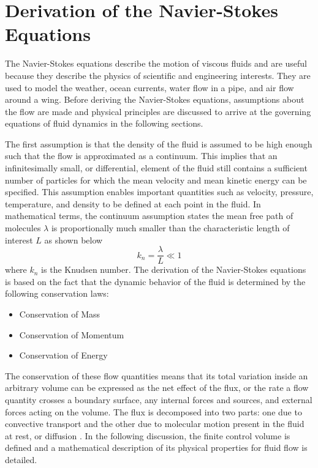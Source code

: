 \section{Derivation of the Navier-Stokes Equations}

The Navier-Stokes equations describe the motion of viscous fluids and are useful because they describe the physics of scientific and engineering interests. They are used to model the weather, ocean currents, water flow in a pipe, and air flow around a wing. Before deriving the Navier-Stokes equations, assumptions about the flow are made and physical principles are discussed to arrive at the governing equations of fluid dynamics in the following sections.

The first assumption is that the density of the fluid is assumed to be high enough such that the flow is approximated as a continuum. This implies that an infinitesimally small, or differential, element of the fluid still contains a sufficient number of particles for which the mean velocity and mean kinetic energy can be specified. This assumption enables important quantities such as velocity, pressure, temperature, and density to be defined at each point in the fluid. In mathematical terms, the continuum assumption states the mean free path of molecules $\lambda$ is proportionally much smaller than the characteristic length of interest $L$ as shown below
%
$$ k_n = \frac{\lambda}{L} \ll 1 $$
%
where $k_n$ is the Knudsen number. The derivation of the Navier-Stokes equations is based on the fact that the dynamic behavior of the fluid is determined by the following conservation laws:
%
\begin{itemize}
\item Conservation of Mass
\item Conservation of Momentum
\item Conservation of Energy
\end{itemize}

The conservation of these flow quantities means that its total variation inside an arbitrary volume can be expressed as the net effect of the flux, or the rate a flow quantity crosses a boundary surface, any internal forces and sources, and external forces acting on the volume. The flux is decomposed into two parts: one due to convective transport and the other due to molecular motion present in the fluid at rest, or diffusion \cite{BlazekText}. In the following discussion, the finite control volume is defined and a mathematical description of its physical properties for fluid flow is detailed.

